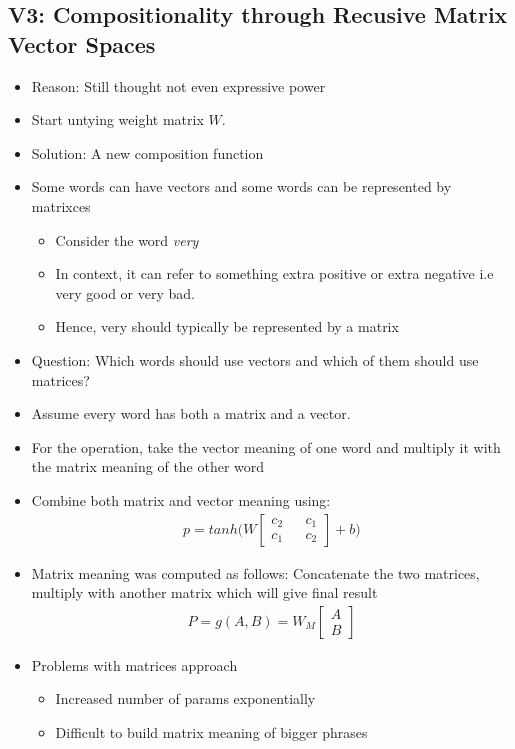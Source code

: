 \documentclass[a4paper]{article}
\begin{document}
\subsection{V3: Compositionality through Recusive Matrix Vector Spaces}
\begin{itemize}
    \item Reason: Still thought not even expressive power
    \item Start untying weight matrix $W$.
    \item Solution: A new composition function
    \item Some words can have vectors and some words can be represented by matrixces
    \begin{itemize}
        \item Consider the word \textit{very} 
        \item In context, it can refer to something extra positive or extra negative i.e very good or very bad.
        \item Hence, very should typically be represented by a matrix
    \end{itemize}
    \item Question: Which words should use vectors and which of them should use matrices?
    \item Assume every word has both a matrix and a vector.
    \item For the operation, take the vector meaning of one word and multiply it with the matrix meaning of the other word
    \item Combine both matrix and vector meaning using:
    \begin{equation}
    \begin{split}  
    p = tanh\bigg(W\begin{bmatrix} c_2 && c_1 \\ c_1 && c_2 \end{bmatrix}  + b\bigg)
    \end{split}
    \end{equation}
    \item Matrix meaning was computed as follows: Concatenate the two matrices, multiply with another matrix which will give final result
    \begin{equation}
    \begin{split}
        P = g(A,B) = W_M \begin{bmatrix} A \\ B \end{bmatrix} 
    \end{split}
    \end{equation}
    \item Problems with matrices approach
    \begin{itemize}
        \item Increased number of params exponentially
        \item Difficult to build matrix meaning of bigger phrases
    \end{itemize}
\end{itemize}
\end{document}
